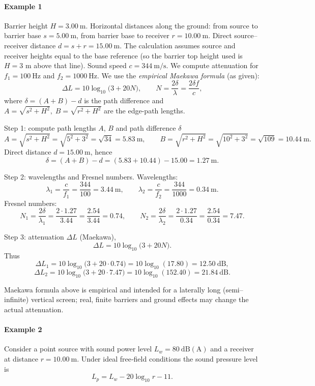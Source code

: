 \paragraph{Example 1}
Barrier height \(H=3.00\ \mathrm{m}\). Horizontal distances along the ground:
from source to barrier base \(s=5.00\ \mathrm{m}\), from barrier base to receiver \(r=10.00\ \mathrm{m}\). Direct source–receiver distance \(d=s+r=15.00\ \mathrm{m}\). The calculation assumes source and receiver heights equal to the base reference (so the barrier top height used is \(H=3\) m above that line). Sound speed \(c=344\ \mathrm{m/s}\).
We compute attenuation for \(f_1=100\ \mathrm{Hz}\) and \(f_2=1000\ \mathrm{Hz}\).
We use the \emph{empirical Maekawa formula} (as given):
\[
\Delta L = 10\log_{10}\!\bigl(3+20N\bigr),
\qquad N=\frac{2\delta}{\lambda}=\frac{2\delta f}{c},
\]
where \(\delta=(A+B)-d\) is the path difference and
\(A=\sqrt{s^2+H^2},\; B=\sqrt{r^2+H^2}\) are the edge-path lengths.

Step 1: compute path lengths \(A\), \(B\) and path difference \(\delta\)
\[
A=\sqrt{s^{2}+H^{2}}=\sqrt{5^{2}+3^{2}}=\sqrt{34}=5.83\ \mathrm{m},
\qquad
B=\sqrt{r^{2}+H^{2}}=\sqrt{10^{2}+3^{2}}=\sqrt{109}=10.44\ \mathrm{m}.
\]
Direct distance \(d=15.00\ \mathrm{m}\), hence
\[
\delta=(A+B)-d=(5.83+10.44)-15.00=1.27\ \mathrm{m}.
\]

Step 2: wavelengths and Fresnel numbers.
Wavelengths:
\[
\lambda_1=\frac{c}{f_1}=\frac{344}{100}=3.44\ \mathrm{m},\qquad
\lambda_2=\frac{c}{f_2}=\frac{344}{1000}=0.34\ \mathrm{m}.
\]
Fresnel numbers:
\[
N_1=\frac{2\delta}{\lambda_1}=\frac{2\cdot 1.27}{3.44}
= \frac{2.54}{3.44}=0.74,
\qquad
N_2=\frac{2\delta}{\lambda_2}=\frac{2\cdot 1.27}{0.34}
= \frac{2.54}{0.34}=7.47.
\]

Step 3: attenuation \(\Delta L\) (Maekawa),
\[
\Delta L=10\log_{10}\bigl(3+20N\bigr).
\]
Thus
\[
\Delta L_1=10\log_{10}\bigl(3+20\cdot 0.74\bigr)
=10\log_{10}(17.80)=12.50\ \mathrm{dB},
\]
\[
\Delta L_2=10\log_{10}\bigl(3+20\cdot 7.47\bigr)
=10\log_{10}(152.40)=21.84\ \mathrm{dB}.
\]

Maekawa formula above is empirical and intended for a laterally long (semi–infinite) vertical screen; real, finite barriers and ground effects may change the actual attenuation.

\paragraph{Example 2}
Consider a point source with sound power level \(L_{w}=80\ \mathrm{dB(A)}\) and a receiver at distance \(r=10.00\ \mathrm{m}\). Under ideal free‐field conditions the sound pressure level is
\[
L_{p}=L_{w}-20\log_{10}r-11.
\]

